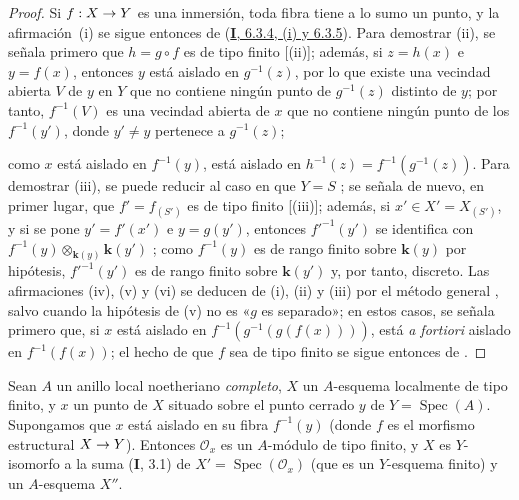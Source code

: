 \documentclass[oneside,10pt]{amsart}
\makeatletter
\newcommand{\ega@arrow}[2]{\mathchoice{#1}{#2}{#2}{#2}}
\renewcommand{\to}{\ega@arrow{\longrightarrow}{\rightarrow}}
\newcommand{\oldpage}[2][]{\marginnote{\normalfont\footnotesize\textbf{#1}~|~#2}\ignorespaces}
\let\EGAOriginalLabel\label
\renewcommand{\label}[1]{\phantomsection\EGAOriginalLabel{#1}}
\makeatother
\begin{document}
\begin{proof}
Si $f:X\to Y$ es una inmersión, toda fibra tiene a lo sumo un punto, y la afirmación~(i) se sigue entonces de (\hyperref[I.6.3.4-fr]{\textbf{I}, 6.3.4, (i) y 6.3.5}).
Para demostrar (ii), se señala primero que $h=g\circ f$ es de tipo finito [\textup{(ii)}];
además, si $z=h(x)$ e $y=f(x)$, entonces $y$ está aislado en $g^{-1}(z)$, por lo que existe una vecindad abierta $V$ de $y$ en $Y$ que no contiene ningún punto de $g^{-1}(z)$ distinto de $y$;
por tanto, $f^{-1}(V)$ es una vecindad abierta de $x$ que no contiene ningún punto 
\oldpage[II]{116}
de los $f^{-1}(y')$, donde $y'\neq y$ pertenece a $g^{-1}(z)$;

como $x$ está aislado en $f^{-1}(y)$, está aislado en $h^{-1}(z)=f^{-1}(g^{-1}(z))$.
Para demostrar (iii), se puede reducir al caso en que $Y=S$ ;
se señala de nuevo, en primer lugar, que $f'=f_{(S')}$ es de tipo finito [(iii)];
además, si $x'\in X'=X_{(S')}$, y si se pone $y'=f'(x')$ e $y=g(y')$, entonces $f'^{-1}(y')$ se identifica con $f^{-1}(y)\otimes_{\boldsymbol{k}(y)}\boldsymbol{k}(y')$ ;
como $f^{-1}(y)$ es de rango finito sobre $\boldsymbol{k}(y)$ por hipótesis, $f'^{-1}(y')$ es de rango finito sobre $\boldsymbol{k}(y')$ y, por tanto, discreto.
Las afirmaciones (iv), (v) y (vi) se deducen de (i), (ii) y (iii) por el método general , salvo cuando la hipótesis de (v) no es «$g$ es separado»;
en estos casos, se señala primero que, si $x$ está aislado en $f^{-1}(g^{-1}(g(f(x))))$, está \emph{a fortiori} aislado en $f^{-1}(f(x))$;
el hecho de que $f$ sea de tipo finito se sigue entonces de .
\end{proof}

\begin{proposition}[6.2.5]
\label{II.6.2.5-fr}
Sean $A$ un anillo local noetheriano \emph{completo}, $X$ un $A$-esquema localmente de tipo finito, y $x$ un punto de $X$ situado sobre el punto cerrado $y$ de $Y=\operatorname{Spec}(A)$.
Supongamos que $x$ está aislado en su fibra $f^{-1}(y)$ (donde $f$ es el morfismo estructural $X\to Y$).
Entonces $\mathcal{O}_x$ es un $A$-módulo de tipo finito, y $X$ es $Y$-isomorfo a la suma \textup{(\textbf{I}, 3.1)} de $X'=\operatorname{Spec}(\mathcal{O}_x)$ (que es un $Y$-esquema finito) y un $A$-esquema $X''$.
\end{proposition}
\end{document}

